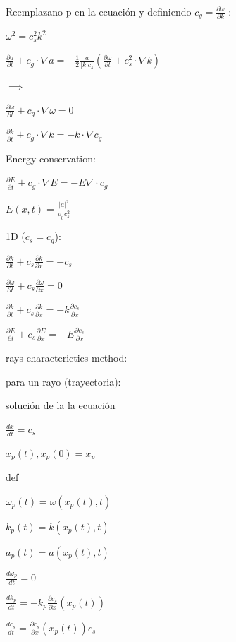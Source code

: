 \documentclass{article}
\begin{document}
Reemplazano p en la ecuación y definiendo $c_g = \frac{\partial \omega}{\partial k}$ :

$\omega^{2} = c_s^{2} k^2$

$\frac{\partial a}{\partial t} + c_g \cdot \nabla a = -\frac{1}{2} \frac{a}{|k| c_s} (\frac{\partial \omega}{\partial t} + c_s^{2} \cdot \nabla k) $


$\implies $



$\frac{\partial \omega}{\partial t} + c_g \cdot \nabla \omega = 0 $

$\frac{\partial k}{\partial t} + c_g \cdot \nabla k = -k \cdot \nabla c_g $

Energy conservation:

$\frac{\partial E}{\partial t} + c_g \cdot \nabla E = -E \nabla \cdot c_g $


$E(x,t) = \frac{|a|^{2}}{\rho_0 c_s^{2}} $

1D ($c_s = c_g$):

$\frac{\partial k}{\partial t} + c_s \frac{\partial k}{\partial x} = -c_s $

$\frac{\partial \omega}{\partial t} + c_s \frac{\partial \omega}{\partial x} = 0 $

$\frac{\partial k}{\partial t} + c_s \frac{\partial k}{\partial x} = -k \frac{\partial c_s}{\partial x} $

$\frac{\partial E}{\partial t} + c_s \frac{\partial E}{\partial x} = -E \frac{\partial  c_s}{\partial x} $




rays characterictics method:

para un rayo (trayectoria):

solución de la la ecuación 

$\frac{dx}{dt} = c_s $

$ x_p(t) , x_p(0) = x_p $

def

$\omega_p(t) = \omega(x_p(t), t)$

$k_p(t) = k(x_p(t), t)$

$a_p(t) = a(x_p(t), t)$




$\frac{d\omega_p}{dt} = 0$

$\frac{dk_p}{dt} = -k_p \frac{\partial c_s}{\partial x} (x_p(t))$





$\frac{dc_s}{dt}  =  \frac{\partial c_s}{\partial x}(x_p(t)) c_s$
\end{document}
